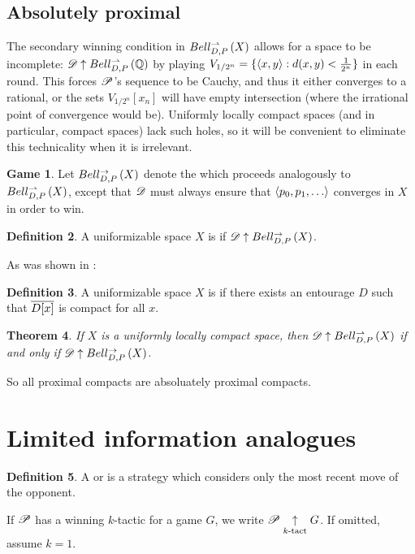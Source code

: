 \documentclass{amsart}
\newtheorem{theorem}{Theorem}[section]
\theoremstyle{definition}
\newtheorem{definition}[theorem]{Definition}
\newtheorem{game}[theorem]{Game}
\begin{document}
\subsection{Absolutely proximal}

  The secondary winning condition in \(Bell_{D,P}^{\rightharpoonup}\left({X}\right)\)
  allows for a space to be incomplete: \(\mathscr{D}\uparrow Bell_{D,P}^{\rightharpoonup}\left({\mathbb{Q}}\right)\) by
  playing \(V_{1/2^n}=\{\langle x,y\rangle:d(x,y)<\frac{1}{2^n}\}\) in each round. This
  forces \(\mathscr{P}\)'s sequence to be Cauchy, and thus it either converges to
  a rational, or the sets \(V_{1/2^n}[x_n]\) will have empty intersection
  (where the irrational point of convergence would be). Uniformly locally
  compact spaces (and in particular, compact spaces) lack such holes, so it
  will be convenient to eliminate this technicality when it is irrelevant.

  \begin{game}
    Let \(Bell_{D,P}^{\to}\left({X}\right)\) denote the
     which
    proceeds analogously to \(Bell_{D,P}^{\rightharpoonup}\left({X}\right)\), except
    that \(\mathscr{D}\) must always ensure that \(\<p_0,p_1,\dots\>\) converges
    in \(X\) in order to win.
  \end{game}

  \begin{definition}
    A uniformizable space \(X\) is  if
    \(\mathscr{D} \uparrow Bell_{D,P}^{\to}\left({X}\right)\).
  \end{definition}

  As was shown in \cite{MR3227201}:

  \begin{definition}
    A uniformizable space \(X\) is  if there
    exists an entourage \(D\) such that \(\overline{D[x]}\) is compact
    for all \(x\).
  \end{definition}

  \begin{theorem}\label{uniformlyLocallyCompact}
    If \(X\) is a uniformly locally compact space, then
    \(\mathscr{D} \uparrow Bell_{D,P}^{\rightharpoonup}\left({X}\right)\) if and only if
    \(\mathscr{D} \uparrow Bell_{D,P}^{\to}\left({X}\right)\).
  \end{theorem}

  So all proximal compacts are absoluately proximal compacts.


\section{Limited information analogues}

  \begin{definition}
    A  or 
    is a strategy which considers only the most recent move of the opponent.

    If \(\mathscr{P}\) has a winning \(k\)-tactic for a game \(G\), we write
    \(\mathscr{P}\underset{k\text{-tact}}{\uparrow} G\). If omitted, assume \(k=1\).
  \end{definition}
\end{document}
